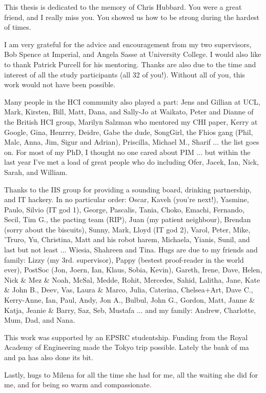 
\noindent
This thesis is dedicated to the memory of Chris Hubbard.  You were a great friend, and I really miss you.  You showed us how to be strong during the hardest of times.  

\noindent
I am very grateful for the advice and encouragement from my two supervisors, Bob Spence at Imperial, and Angela Sasse at University College.  I would also like to thank Patrick Purcell for his mentoring.  Thanks are also due to the time and interest of all the study participants (all 32 of you!). Without all of you, this work would not have been possible.

Many people in the HCI community also played a part: Jens and Gillian at UCL, Mark, Kirsten, Bill, Matt, Dana, and Sally-Jo at Waikato, Peter and Dianne of the British HCI group, Marilyn Salzman who mentored my CHI paper, Kerry at Google, Gina, Henrrry, Deidre, Gabe the dude, SongGirl, the Fhios gang (Phil, Malc, Anna, Jim, Sigur and Adrian), Priscilla, Michael M., Sharif ... the list goes on.
For most of my PhD, I thought no one cared about PIM ... but within the last year I've met a load of great people who do including Ofer, Jacek, Ian, Nick, Sarah, and William.

\noindent
Thanks to the IIS group for providing a sounding board, drinking partnership, and IT hackery.  In no particular order: Oscar, Kaveh (you're next!), Yasmine, Paulo, Silvio (IT god 1), George, Pascalis, Tania, Choko, Emachi, Fernando, Secil, Tim G., the pacting team (RIP), Juan (my patient neighbour), Brendan (sorry about the biscuits), Sunny, Mark, Lloyd (IT god 2), Varol, Peter, Mike, 'Truro, Yu, Christina, Matt and his robot harem, Michaela, Yianis, Sunil, and last but not least ... Wiesia, Shahreen and Tina.
Hugs are due to my friends and family: Lizzy (my 3rd. supervisor), Pappy (bestest proof-reader in the world ever), PostSoc (Jon, Joern, Ian, Klaus, Sobia, Kevin), Gareth, Irene, Dave, Helen, Nick \& Mez \& Noah, McSal, Medde, Rohit, Mercedes, Sahid, Lalitha, Jane, Kate \& John B., Deev, Vas, Laura \& Marco, Julia, Caterina, Chelsea+Art, Dave C., Kerry-Anne, Ian, Paul, Andy, Jon A., Bulbul, John G., Gordon, Matt, Janne \& Katja, Jeanie \& Barry, Saz, Seb, Mustafa ... and my family: Andrew, Charlotte, Mum, Dad, and Nana.

\noindent
This work was supported by an EPSRC studentship.  Funding from the Royal Academy of Engineering made the Tokyo trip possible.  Lately the bank of ma and pa has also done its bit.

\noindent
Lastly, hugs to Milena for all the time she had for me, all the waiting she did for me, and for being so warm and compassionate.